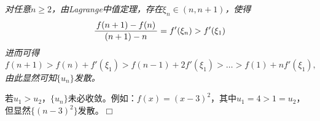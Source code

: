 \begin{frame}
	\linespread{1.5}
	
	
	\small \it
	对任意$n\geq2$，由Lagrange中值定理，存在$\xi_n\in(n,n+1)$，使得
	$$\displaystyle\frac{\,{f(n+1)-f(n)}\,}{\,{(n+1)-n}\,}=f'(\xi_n)>f'(\xi_1)$$
	进而可得
	$$
	f(n+1)>f(n)+f'(\xi_1)>f(n-1)+2f'(\xi_1)>\ldots>f(1)+nf'(\xi_1),
	$$
	由此显然可知$\{u_n\}$发散。
	
	若$u_1>u_2$，$\{u_n\}$未必收敛。例如：$f(x)=(x-3)^2$，其中$u_1=4>1=u_2$，
	但显然$\{(n-3)^2\}$发散。\hfill$\Box$
\end{frame}